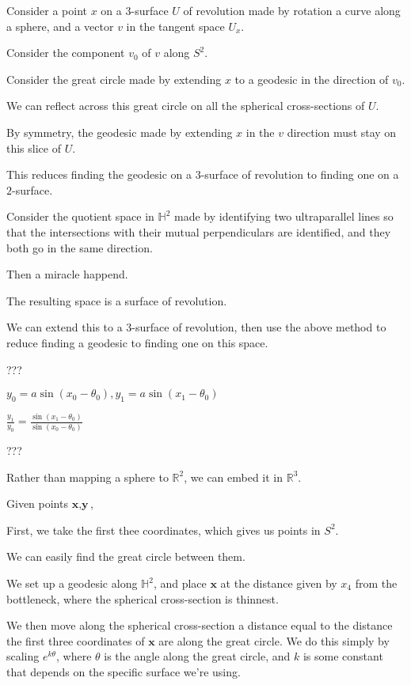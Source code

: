 \documentclass[12pt]{amsart}
\begin{document}


Consider a point $x$ on a $3$-surface $U$ of revolution made by rotation a curve along a sphere, and a vector $v$ in the tangent space $U_x$.

Consider the component $v_0$ of $v$ along $S^2$.

Consider the great circle made by extending $x$ to a geodesic in the direction of $v_0$.

We can reflect across this great circle on all the spherical cross-sections of $U$.

By symmetry, the geodesic made by extending $x$ in the $v$ direction must stay on this slice of $U$.

This reduces finding the geodesic on a $3$-surface of revolution to finding one on a $2$-surface.

Consider the quotient space in $\mathbb{H}^2$ made by identifying two ultraparallel lines so that the intersections with their mutual perpendiculars are identified, and they both go in the same direction.

Then a miracle happend.

The resulting space is a surface of revolution.

We can extend this to a $3$-surface of revolution, then use the above method to reduce finding a geodesic to finding one on this space.

???

$y_0 = a\sin(x_0-\theta_0), y_1 = a\sin(x_1-\theta_0)$

$\frac{y_1}{y_0} = \frac{\sin(x_1-\theta_0)}{\sin(x_0-\theta_0)}$

???

Rather than mapping a sphere to $\mathbb{R}^2$, we can embed it in $\mathbb{R}^3$.

Given points $\textbf{x}, \textbf{y}$,

First, we take the first thee coordinates, which gives us points in $S^2$.

We can easily find the great circle between them.

We set up a geodesic along $\mathbb{H}^2$, and place $\textbf{x}$ at the distance given by $x_4$ from the bottleneck, where the spherical cross-section is thinnest.

We then move along the spherical cross-section a distance equal to the distance the first three coordinates of $\textbf{x}$ are along the great circle. We do this simply by scaling $e^{k\theta}$, where $\theta$ is the angle along the great circle, and $k$ is some constant that depends on the specific surface we're using.
\end{document}
